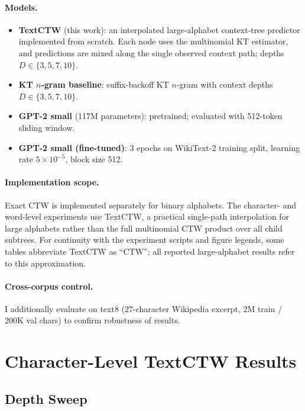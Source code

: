 \documentclass[11pt,a4paper]{article}
\begin{document}
\paragraph{Models.}
\begin{itemize}[leftmargin=1.5em]
  \item \textbf{TextCTW} (this work): an interpolated large-alphabet
        context-tree predictor implemented from scratch. Each node uses the
        multinomial KT estimator, and predictions are mixed along the single
        observed context path; depths $D \in \{3,5,7,10\}$.
  \item \textbf{KT $n$-gram baseline}: suffix-backoff KT $n$-gram with
        context depths $D \in \{3,5,7,10\}$.
  \item \textbf{GPT-2 small} (117M parameters): pretrained; evaluated
        with 512-token sliding window.
  \item \textbf{GPT-2 small (fine-tuned)}: 3 epochs on WikiText-2 training split,
        learning rate $5\times10^{-5}$, block size 512.
\end{itemize}

\paragraph{Implementation scope.}
Exact CTW is implemented separately for binary alphabets. The character- and
word-level experiments use TextCTW, a practical single-path interpolation for
large alphabets rather than the full multinomial CTW product over all child
subtrees. For continuity with the experiment scripts and figure legends, some
tables abbreviate TextCTW as ``CTW''; all reported large-alphabet results refer
to this approximation.

\paragraph{Cross-corpus control.}
I additionally evaluate on text8
($27$-character Wikipedia excerpt, 2M train / 200K val chars)
to confirm robustness of results.

\section{Character-Level TextCTW Results}
\label{sec:char}

\subsection{Depth Sweep}
\label{ssec:depth}
\end{document}
